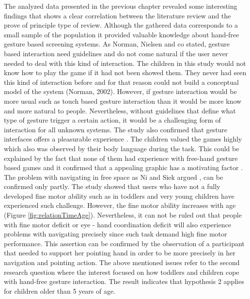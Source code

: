 The analyzed data presented in the previous chapter revealed some interesting findings that shows a clear correlation between the literature review and the prove of principle type of review. Although the gathered data corresponds to a small sample of the population it provided valuable knowledge about hand-free gesture based screening systems. As Norman, Nielsen and co stated, gesture based interaction need guidelines and do not come natural if the user never needed to deal with this kind of interaction. The children in this study would not know how to play the game if it had not been showed them. They never had seen this kind of interaction before and for that reason could not build a conceptual model of the system (Norman, 2002). However, if gesture interaction would be more usual such as touch based gesture interaction than it would be more know and more natural to people. Nevertheless, without guidelines that define what type of gesture trigger a certain action, it would be a challenging form of interaction for all unknown systems. 
The study also confirmed that gesture interfaces offers a pleasurable experience \cite{Loehmann2013, RenGang2013}. The children valued the games highly which also was observed by their body language during the task. This could be explained by the fact that none of them had experience with free-hand gesture based games and it confirmed that a appealing graphic has a motivating factor \cite{Charsky2010, Paraskevopoulos2014}.
The problem with navigating in free space as Ni and Siek argued \cite{Siek2005, Ni2011}, can be confirmed only partly. The study showed that users who have not a fully developed fine motor ability such as in toddlers and very young children have experienced such challenge. However, the fine motor ability increases with age (Figure \ref{fig:relationTimeAge}). Nevertheless, it can not be ruled out that people with fine motor deficit or eye - hand coordination deficit will also experience problems with navigating precisely since such task demand high fine motor performance. This assertion can be confirmed by the observation of a participant that needed to support her pointing hand in order to be more precisely in her navigation and pointing action. 
The above mentioned issues refer to the second research question where the interest focused on how toddlers and children cope with hand-free gesture interaction. The result indicates that hypothesis 2 applies for children older than 5 years of age.

